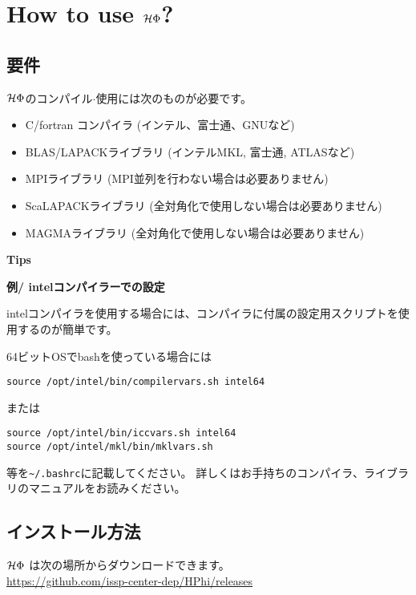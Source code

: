 \chapter{How to use $\mathcal{H} \Phi$?}
\label{Ch:HowTo}

\section{要件}

$\mathcal{H} \Phi$のコンパイル$\cdot$使用には次のものが必要です。
\begin{itemize}
\item C/fortran コンパイラ (インテル、富士通、GNUなど)
\item BLAS/LAPACKライブラリ (インテルMKL, 富士通, ATLASなど)
\item MPIライブラリ (MPI並列を行わない場合は必要ありません)
\item ScaLAPACKライブラリ (全対角化で使用しない場合は必要ありません)
\item MAGMAライブラリ (全対角化で使用しない場合は必要ありません)
\end{itemize}

\begin{screen}
\Large 
{\bf Tips}
\normalsize

{\bf 例/ intelコンパイラーでの設定}

intelコンパイラを使用する場合には、コンパイラに付属の設定用スクリプトを使用するのが簡単です。

64ビットOSでbashを使っている場合には
\begin{verbatim}
source /opt/intel/bin/compilervars.sh intel64
\end{verbatim}
または
\begin{verbatim}
source /opt/intel/bin/iccvars.sh intel64
source /opt/intel/mkl/bin/mklvars.sh
\end{verbatim}
等を\verb|~/.bashrc|に記載してください。
詳しくはお手持ちのコンパイラ、ライブラリのマニュアルをお読みください。

\end{screen}


\section{インストール方法}

$\mathcal{H} \Phi$ は次の場所からダウンロードできます。\\
\url{https://github.com/issp-center-dep/HPhi/releases}

